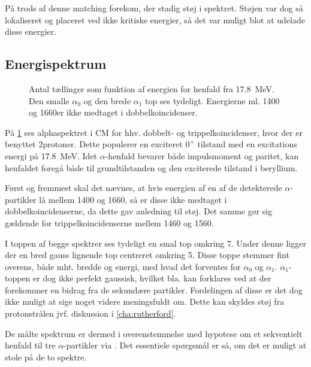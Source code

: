 På trods af denne matching forekom, der stadig støj i spektret. Støjen var dog så lokaliseret og
placeret ved ikke kritiske energier, så det var muligt blot at udelade disse energier.


\subsection{Energispektrum}
\label{sec:energispektrum}


\begin{figure}[h!]
  \centering
  \hfill
  \caption{Antal tællinger som funktion af energien for henfald fra \SI{17.8}{\MeV}. Den smalle
    $\alpha_{0}$ og den brede $\alpha_{1}$ top ses tydeligt. Energierne ml. 1400 og 1660\keV er ikke medtaget
    i dobbelkoincidenser. }
  \label{fig:alphaSpectrum}
\end{figure}

På \cref{fig:alphaSpectrum} ses alphaspektret i CM for hhv. dobbelt- og trippelkoincidenser, hvor
der er benyttet 2\MeV protoner. Dette populerer en exciteret $0^{+}$ tilstand med en excitations
energi på \SI{17.8}{\MeV}. Idet $\alpha$-henfald bevarer både impulsmoment og paritet, kan henfaldet
foregå både til grundtilstanden og den exciterede tilstand i beryllium.

Først og fremmest skal det nævnes, at hvis energien af en af de detekterede $\alpha$-partikler lå mellem
1400 og 1660\keV, så er disse ikke medtaget i dobbelkoincidenserne, da dette gav anledning til
støj. Det samme gør sig gældende for trippelkoincidenserne mellem 1460 og 1560\keV.

I toppen af begge spektrer ses tydeligt en smal top omkring 7\MeV. Under denne ligger der en bred
gauss lignende top centreret omkring 5\MeV. Disse toppe stemmer fint overens, både mht. bredde og
energi, med hvad det forventes for $\alpha_{0}$ og $\alpha_{1}$. $\alpha_{1}$-toppen er dog ikke perfekt gaussisk,
hvilket bla. kan forklares ved at der forekommer en bidrag fra de sekundære partikler. Fordelingen
af disse er det dog ikke muligt at sige noget videre meningsfuldt om. Dette kan skyldes støj fra
protonstrålen jvf. diskussion i \cref{cha:rutherford}. 

De målte spektrum er dermed i overenstemmelse med hypotese om et sekventielt henfald til tre
$\alpha$-partikler via \Be. Det essentiele spørgsmål er så, om det er muligt at stole på de to
spektre.

